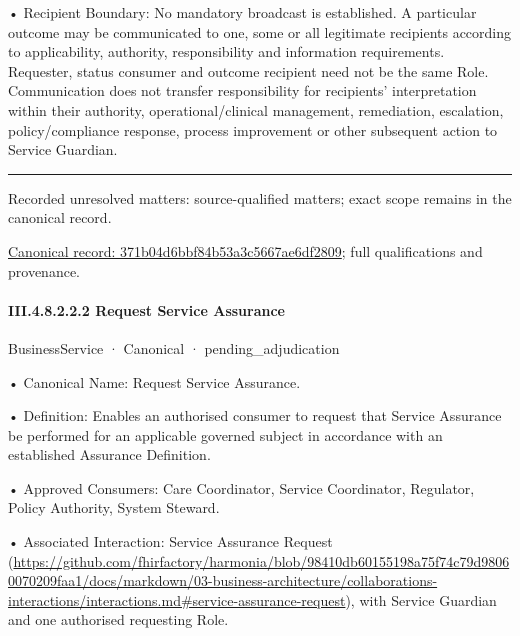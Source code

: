 •
Recipient Boundary: No mandatory broadcast is established. A particular outcome may be communicated to one, some or all legitimate recipients according to applicability, authority, responsibility and information requirements. Requester, status consumer and outcome recipient need not be the same Role. Communication does not transfer responsibility for recipients' interpretation within their authority, operational/clinical management, remediation, escalation, policy/compliance response, process improvement or other subsequent action to Service Guardian.



\medskip\hrule\medskip

{\small Recorded unresolved matters: source-qualified matters; exact scope remains in the canonical record.}\par
{\footnotesize \href{../../../../../../../../continuum/business/business-service/371b04d6bbf84b53a3c5667ae6df2809.md}{Canonical record: 371b04d6bbf84b53a3c5667ae6df2809}; full qualifications and provenance.}\par
\paragraph*{III.4.8.2.2.2 Request Service Assurance}
\label{navigation:III.4.8.2.2.2}

\label{element:a76c0be369744fcfb5eb91b90c9b59e7}
{\small BusinessService · Canonical · pending\_adjudication}\par

•
Canonical Name: Request Service Assurance.



•
Definition: Enables an authorised consumer to request that Service Assurance be performed for an applicable governed subject in accordance with an established Assurance Definition.



•
Approved Consumers: Care Coordinator, Service Coordinator, Regulator, Policy Authority, System Steward.



•
Associated Interaction: Service Assurance Request (\url{https://github.com/fhirfactory/harmonia/blob/98410db60155198a75f74c79d98060070209faa1/docs/markdown/03-business-architecture/collaborations-interactions/interactions.md#service-assurance-request}), with Service Guardian and one authorised requesting Role.



